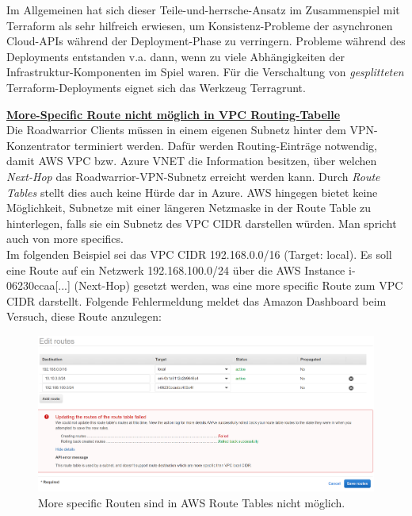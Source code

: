 Im Allgemeinen hat sich dieser \glqq Teile-und-herrsche\grqq{}-Ansatz im Zusammenspiel mit Terraform als sehr hilfreich erwiesen, um Konsistenz-Probleme der asynchronen Cloud-APIs während der \gls{Deployment}-Phase zu verringern\cite[S.183-184]{Brikman2019}. Probleme während des \gls{Deployment}s entstanden v.a. dann, wenn \glqq zu viele\grqq{} Abhängigkeiten der Infrastruktur-Komponenten im Spiel waren. Für die Verschaltung von \textit{gesplitteten} Terraform-\gls{Deployment}s eignet sich das Werkzeug Terragrunt\cite[S.98]{Brikman2019}.

\newpage
\textbf{\underline{More-Specific Route nicht möglich in VPC Routing-Tabelle}}\\
Die Roadwarrior Clients müssen in einem eigenen Subnetz \glqq hinter\grqq{} dem VPN-Konzentrator terminiert werden. Dafür werden Routing-Einträge notwendig, damit AWS VPC bzw. Azure VNET die Information besitzen, über welchen \textit{Next-Hop} das Roadwarrior-VPN-Subnetz erreicht werden kann. Durch \textit{Route Tables} stellt dies auch keine Hürde dar in Azure. AWS hingegen bietet keine Möglichkeit, Subnetze mit einer längeren Netzmaske in der Route Table zu hinterlegen, falls sie ein Subnetz des VPC CIDR darstellen würden. Man spricht auch von \glqq more specifics\grqq{}.\\
Im folgenden Beispiel sei das VPC CIDR 192.168.0.0/16 (Target: local). Es soll eine Route auf ein Netzwerk 192.168.100.0/24 über die AWS Instance \glqq i-06230ccaa[...]\grqq{} (Next-Hop) gesetzt werden, was eine more specific Route zum VPC CIDR darstellt.
Folgende Fehlermeldung meldet das Amazon Dashboard beim Versuch, diese Route anzulegen:

\begin{figure}[h]
  \centering
  \includegraphics[scale=0.35]{Figures/more_specific_not_allowed_aws.PNG}
  \caption{More specific Routen sind in AWS Route Tables nicht möglich.}
  \label{grafik:more_specific_not_allowed_aws}
\end{figure}\FloatBarrier

